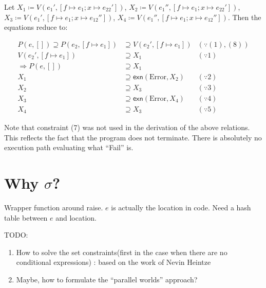 \documentclass{article}
\begin{document}
Let $X_{1}\coloneq V(e_{1}',[f\mapsto e_{1};x\mapsto e_{22}'])$, $X_{2}\coloneq V(e_{1}'',[f\mapsto e_{1};x\mapsto e_{22}'])$, $X_{3}\coloneq V(e_{1}',[f\mapsto e_{1};x\mapsto e_{12}''])$, $X_{4}\coloneq V(e_{1}'',[f\mapsto e_{1};x\mapsto e_{12}''])$. Then the equations reduce to:

\begin{align*}
  P(e,[])\supseteq P(e_{2},[f\mapsto e_{1}])&\supseteq V(e_{2}',[f\mapsto e_{1}]) & (\because (1),(8))\\
  V(e_{2}',[f\mapsto e_{1}])&\supseteq X_{1} & (\because 1)\\
  \Rightarrow P(e,[])&\supseteq X_{1} & \\
  X_{1}&\supseteq \mathsf{exn}(\text{Error},X_{2}) & (\because 2)\\
  X_{2}&\supseteq X_{3} & (\because 3)\\
  X_{3}&\supseteq \mathsf{exn}(\text{Error},X_{4}) & (\because 4)\\
  X_{4}&\supseteq X_{3} & (\because 5)
\end{align*}

Note that constraint (7) was not used in the derivation of the above relations. This reflects the fact that the program does not terminate. There is absolutely no execution path evaluating what ``Fail'' is.

\section{Why $\sigma$?}

Wrapper function around raise. $e$ is actually the location in code. Need a hash table between $e$ and location.

TODO:
\begin{enumerate}
  \item How to solve the set constraints(first in the case when there are no conditional expressions) : based on the work of Nevin Heintze\cite{Hei91}
  \item Maybe, how to formulate the ``parallel worlds'' approach?
\end{enumerate}
\printbibliography
\end{document}
